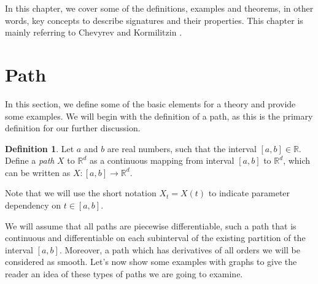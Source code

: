 \documentclass[12pt,a4paper]{report}
\theoremstyle{definition}
\newtheorem{definition}{Definition}
\begin{document}
In this chapter, we cover some of the definitions, examples and theorems, in other words, key concepts to describe signatures and their properties. This chapter is mainly referring to Chevyrev and  Kormilitzin \parencite{chevyrev2016primer}.


\section{Path}

In this section, we define some of the basic elements for a theory and provide some examples. We will begin with the definition of a path, as this is the primary definition for our further discussion.
\begin{definition}
	 Let $a$ and $b$ are real numbers, such that the interval $[a,b]\in \mathbb{R}$. Define a \textit{path} $X$ to $\mathbb{R}^d$ as a continuous mapping from interval $[a,b]$ to $\mathbb{R}^d$, which can be written as $X:[a,b]\rightarrow\mathbb{R}^d$.  
\end{definition}
Note that we will use the short notation $X_t = X(t)$ to indicate parameter dependency on $t\in[a,b]$. 

We will assume that all paths are piecewise differentiable, such a path that is continuous and differentiable on each subinterval of the existing partition of the interval $[a,b]$. Moreover, a path which has derivatives of all orders we will be considered as smooth.
Let's now show some examples with graphs to give the reader an idea of these types of paths we are going to examine.
\end{document}
